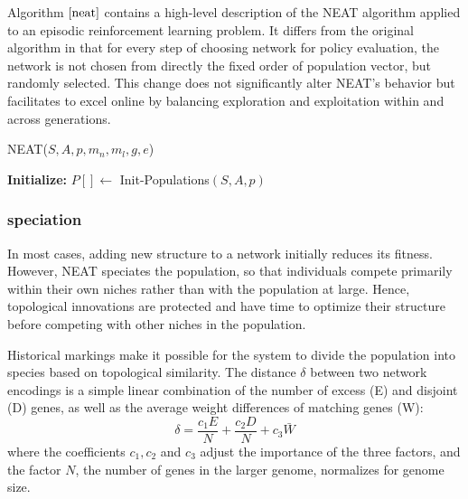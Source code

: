 \documentclass{article}
\begin{document}
Algorithm $\ref{neat}$ contains a high-level description of the NEAT algorithm applied to an episodic reinforcement learning problem. It differs from 
the original algorithm in that for every step of choosing network for policy evaluation, the network is not chosen from directly the fixed order of
population vector, but randomly selected. This change does not significantly alter NEAT’s behavior but facilitates to excel online by balancing exploration and exploitation within and across generations.

\begin{algorithm}[H]
  \label{neat}
  \caption{NEAT($S, A, p , m_n, m_l, g, e$)}
  \textbf{Initialize:} $P[] \leftarrow$ Init-Populations$(S,A,p)$ \;    
  \end{algorithm}

\subsubsection{speciation}
In most cases, adding new structure to a network initially reduces its fitness.
However, NEAT speciates the population, so that individuals compete primarily within their own niches rather than with the population at large.
Hence, topological innovations are protected and have time to optimize their structure before competing with other niches in the population.

Historical markings make it possible for the system to divide the population into species based on topological similarity. 
The distance $\delta$ between two network encodings is a simple linear combination of the number of excess (E) and disjoint (D) genes, as well as the average weight differences of matching genes (W):
\begin{equation}
 \delta = \frac{c_1 E}{N} + \frac{c_2 D}{N}  + c_3 \bar{W}
\end{equation}
where the coefficients $c_1, c_2$ and $c_3$ adjust the importance of the three factors, and the factor $N$, the number of genes in the larger genome, normalizes for genome size.
\end{document}
